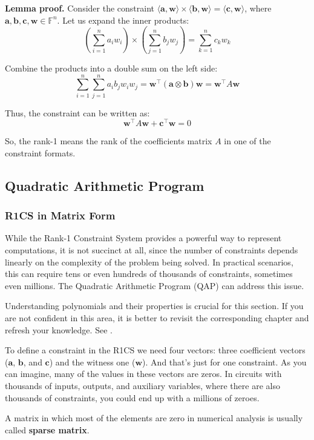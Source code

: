 \documentclass[../lecture-notes.tex]{subfiles}
\begin{document}
\textbf{Lemma proof.} Consider the constraint $\langle \mathbf{a}, \mathbf{w}\rangle \times \langle \mathbf{b}, \mathbf{w}\rangle
= \langle \mathbf{c}, \mathbf{w}\rangle$, where $\mathbf{a}, \mathbf{b}, \mathbf{c}, \mathbf{w} \in \mathbb{F}^n$. Let us expand the inner
products: 
\[ \left(\sum_{i=1}^{n} a_i w_i\right) \times \left(\sum_{j=1}^{n} b_j w_j\right) = \sum_{k=1}^{n} c_k w_k \]

Combine the products into a double sum on the left side:
\[ \sum_{i=1}^{n} \sum_{j=1}^{n} a_i b_j w_i w_j = \mathbf{w}^{\top} (\mathbf{a} \otimes \mathbf{b}) \mathbf{w} = \mathbf{w}^{\top} A \mathbf{w} \]

Thus, the constraint can be written as:
\[ \mathbf{w}^{\top} A \mathbf{w} + \mathbf{c}^{\top} \mathbf{w} = 0 \]

So, the rank-1 means the rank of the coefficients matrix $A$ in one of the constraint formats.

\subsection{Quadratic Arithmetic Program}
\subsubsection{R1CS in Matrix Form}

While the Rank-1 Constraint System provides a powerful way to represent computations, it is not 
succinct at all, since the number of constraints depends linearly on the complexity of the problem 
being solved. In practical scenarios, this can require tens or even hundreds of thousands of 
constraints, sometimes even millions. The Quadratic Arithmetic Program (QAP) can address this issue.

\begin{remark}
    Understanding polynomials and their properties is crucial for this section. If you are not 
    confident in this area, it is better to revisit the corresponding chapter and refresh your
    knowledge. See .
\end{remark}

To define a constraint in the R1CS we need four vectors: three coefficient vectors ($\mathbf{a}$, $\mathbf{b}$, and
$\mathbf{c}$) and the witness one ($\mathbf{w}$). And that's just for one constraint. As you can imagine, many of
the values in these vectors are zeros. In circuits with thousands of inputs, outputs, and auxiliary
variables, where there are also thousands of constraints, you could end up with a millions of zeroes.
\begin{remark}
    A matrix in which most of the elements are zero in numerical analysis is usually called \textbf{sparse
    matrix}.
\end{remark}
\end{document}

